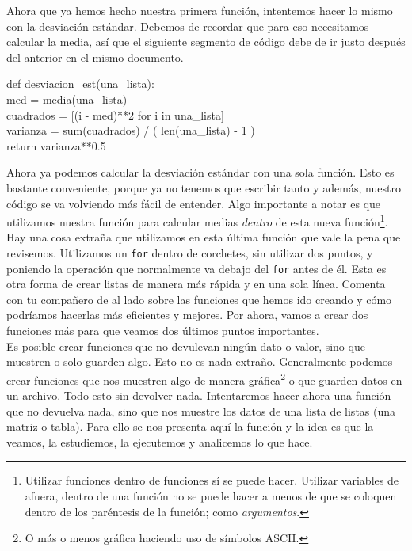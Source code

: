 \documentclass[10pt,letterpaper]{article}
\newcommand{\inlinecode}[1]{
\colorbox{light-gray}{\texttt{#1}}
}
\newenvironment{Code}
{
\begin{lrbox}{\selvestebox}%
\begin{minipage}{\dimexpr\columnwidth-2\fboxsep\relax}
\fontfamily{\ttdefault}\selectfont
}
{\end{minipage}\end{lrbox}%
\begin{center}
\colorbox{light-gray}{\usebox{\selvestebox}}
\end{center}
}
\begin{document}
Ahora que ya hemos hecho nuestra primera funci\'on, intentemos hacer lo mismo con la desviaci\'on est\'andar. Debemos de recordar que para eso necesitamos calcular la media, as\'i que el siguiente segmento de c\'odigo debe de ir justo despu\'es del anterior en el mismo documento.

\begin{Code}
def desviacion\_est(una\_lista):\\
\hspace*{4mm} med = media(una\_lista)\\
\hspace*{4mm} cuadrados = [(i - med)**2 for i in una\_lista]\\
\hspace*{4mm} varianza = sum(cuadrados) / ( len(una\_lista) - 1 )\\
\hspace*{4mm} return varianza**0.5
\end{Code}

Ahora ya podemos calcular la desviaci\'on est\'andar con una sola funci\'on. Esto es bastante conveniente, porque ya no tenemos que escribir tanto y adem\'as, nuestro c\'odigo se va volviendo m\'as f\'acil de entender. Algo importante a notar es que utilizamos nuestra funci\'on para calcular medias \emph{dentro} de esta nueva funci\'on\footnote{Utilizar funciones dentro de funciones s\'i se puede hacer. Utilizar variables de afuera, dentro de una funci\'on no se puede hacer a menos de que se coloquen dentro de los par\'entesis de la funci\'on; como \textit{argumentos}.}. Hay una cosa extra\~na que utilizamos en esta \'ultima funci\'on que vale la pena que revisemos. Utilizamos un \inlinecode{for} dentro de corchetes, sin utilizar dos puntos, y poniendo la operaci\'on que normalmente va debajo del \inlinecode{for} antes de \'el. Esta es otra forma de crear listas de manera m\'as r\'apida y en una sola l\'inea. Comenta con tu compa\~nero de al lado sobre las funciones que hemos ido creando y c\'omo podr\'iamos hacerlas m\'as eficientes y mejores. Por ahora, vamos a crear dos funciones m\'as para que veamos dos \'ultimos puntos importantes.\\

Es posible crear funciones que no devulevan ning\'un dato o valor, sino que muestren o solo guarden algo. Esto no es nada extra\~no. Generalmente podemos crear funciones que nos muestren algo de manera gr\'afica\footnote{O m\'as o menos gr\'afica haciendo uso de s\'imbolos ASCII.} o que guarden datos en un archivo. Todo esto sin devolver nada. Intentaremos hacer ahora una funci\'on que no devuelva nada, sino que nos muestre los datos de una lista de listas (una matriz o tabla). Para ello se nos presenta aqu\'i la funci\'on y la idea es que la veamos, la estudiemos, la ejecutemos y analicemos lo que hace.
\end{document}
